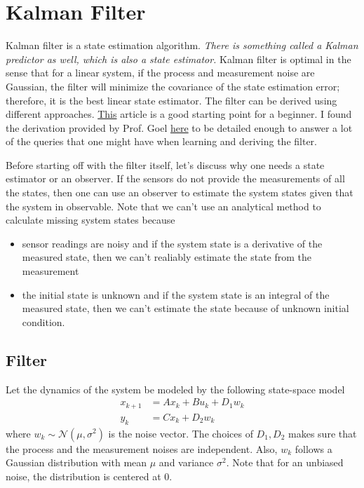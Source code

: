 \section{Kalman Filter}
\hspace{\parindent}Kalman filter is a state estimation algorithm. \textit{There is something called a Kalman predictor as well, which is also a state estimator.} Kalman filter is optimal in the sense that for a linear system, if the process and measurement noise are Gaussian, the filter will minimize the covariance of the state estimation error; therefore, it is the best linear state estimator. The filter can be derived using different approaches. \href{https://ieeexplore.ieee.org/document/6279585}{This} article is a good starting point for a beginner. I found the derivation provided by Prof. Goel \href{https://www.youtube.com/watch?v=bVj_EfWFvqs}{here} to be detailed enough to answer a lot of the queries that one might have when learning and deriving the filter.

Before starting off with the filter itself, let's discuss why one needs a state estimator or an observer. If the sensors do not provide the measurements of all the states, then one can use an observer to estimate the system states given that the system in observable. Note that we can't use an analytical method to calculate missing system states because
\begin{itemize}
    \item sensor readings are noisy and if the system state is a derivative of the measured state, then we can't realiably estimate the state from the measurement
    \item the initial state is unknown and if the system state is an integral of the measured state, then we can't estimate the state because of unknown initial condition.
\end{itemize}

\subsection{Filter}
\hspace{\parindent}Let the dynamics of the system be modeled by the following state-space model
\begin{align}
    x_{k+1} &= A x_k + B u_k + D_1 w_k \\
    y_k &= C x_k + D_2 w_k
    \label{eqn:stateSpaceModelWNoise}
\end{align}
where $w_k \sim\mathcal{N}(\mu, \sigma^2)$ is the noise vector. The choices of $D_1, D_2$ makes sure that the process and the measurement noises are independent. Also, $w_k$ follows a Gaussian distribution with mean $\mu$ and variance $\sigma^2$. Note that for an unbiased noise, the distribution is centered at $0$.

